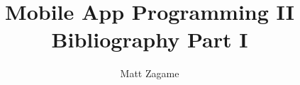 \documentclass[11pt]{article}
\begin{document}
\title{Mobile App Programming II Bibliography Part I}
\author{Matt Zagame}
\maketitle
\nocite{*}

\end{document}
